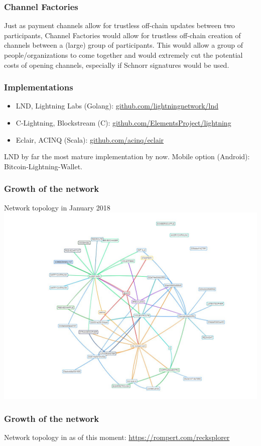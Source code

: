 \documentclass{beamer}
\begin{document}
\begin{frame}
\frametitle{Channel Factories}
Just as payment channels allow for trustless off-chain updates between two participants, Channel Factories would allow for trustless off-chain creation of channels between a (large) group of participants. This would allow a group of people/organizations to come together and would extremely cut the potential costs of opening channels, especially if Schnorr signatures would be used.
\end{frame}
\begin{frame}
\frametitle{Implementations}
\begin{itemize}
\item LND, Lightning Labs (Golang): \url{github.com/lightningnetwork/lnd}
\item C-Lightning, Blockstream (C): \url{github.com/ElementsProject/lightning}
\item Eclair, ACINQ (Scala): \url{github.com/acinq/eclair}
\end{itemize}
LND by far the most mature implementation by now. 
Mobile option (Android): Bitcoin-Lightning-Wallet.
\end{frame}
\begin{frame}
\frametitle{Growth of the network}
Network topology in January 2018
\includegraphics[scale=0.2]{images/earlylightning1.jpg}
\end{frame}
\begin{frame}
\frametitle{Growth of the network}
Network topology in as of this moment:
\url{https://rompert.com/recksplorer}
\end{frame}
\end{document}
